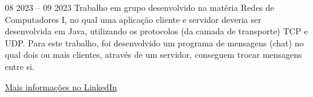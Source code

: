 {
}{08 2023 -- 09 2023}{}
Trabalho em grupo desenvolvido na matéria Redes de Computadores I, no qual uma aplicação cliente e servidor deveria ser desenvolvida em Java, utilizando os protocolos (da camada de transporte) TCP e UDP. Para este trabalho, foi desenvolvido um programa de mensagens (chat) no qual dois ou mais clientes, através de um servidor, conseguem trocar mensagens entre si.\\
\divider

{\large\color{emphasis}\href{https://www.linkedin.com/in/henriquemcc/details/projects/}{Mais informações no LinkedIn}}